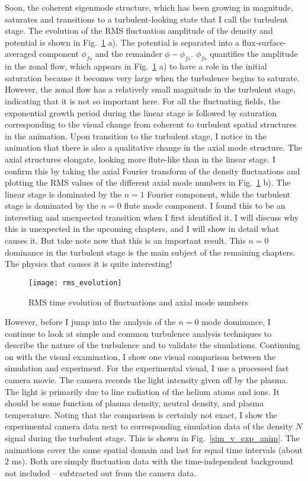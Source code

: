 Soon, the coherent eigenmode structure, which has been growing in magnitude, saturates and transitions to a turbulent-looking state that I call the turbulent stage.
The evolution of the RMS fluctuation amplitude of the density and potential is shown in Fig.~\ref{rms_evolution} a). The potential is separated into a flux-surface-averaged component $\phi_{fs}$
and the remainder $\phi-\phi_{fs}$. $\phi_{fs}$ quantifies the amplitude in the zonal flow, which appears in Fig.~\ref{rms_evolution} a) to have a role in the initial saturation because it becomes
very large when the turbulence begins to saturate. However, the zonal flow has a relatively small magnitude in the turbulent stage, indicating that it is not so important here.
For all the fluctuating fields, the exponential growth period during the linear stage is followed by saturation corresponding to the
visual change from coherent to turbulent spatial structures in the animation. 
Upon transition to the turbulent stage, I notice in the animation that there is also a qualitative change in the axial
mode structure. The axial structures elongate, looking more flute-like than in the linear stage. I confirm this by taking the axial Fourier transform of the density fluctuations and plotting
the RMS values of the different axial mode numbers in Fig.~\ref{rms_evolution} b). The linear stage is dominated by the $n=1$ Fourier component, while the turbulent stage is dominated
by the $n=0$ flute mode component. I found this to be an interesting and unexpected transition when I first identified it. 
I will discuss why this is unexpected in the upcoming chapters, and I will show in detail what causes it. 
But take note now that this is an important result. This $n=0$ dominance in the turbulent stage is the main subject of the remaining chapters. The physics that causes it is quite interesting!


\begin{figure}
\centerline{\texttt{[image: rms\_evolution]}}
\caption{RMS time evolution of fluctuations and axial mode numbers}
\label{rms_evolution}
\end{figure}


However, before I jump into the analysis of the $n=0$ mode dominance, I continue to look at simple and common turbulence analysis techniques to describe the nature of the turbulence
and to validate the simulations.
Continuing on with the visual examination, I show one visual comparison between the simulation and experiment. For the experimental visual, I use a processed
fast camera movie. The camera records the light intensity given off by the plasma. The light is primarily due to line radiation of the helium atoms and ions. It should be some function
of plasma density, neutral density, and plasma temperature. Noting that the comparison is certainly not exact, I show the experimental camera data next to corresponding simulation
data of the density $N$ signal during the turbulent stage. This is shown in Fig.~\ref{sim_v_exp_anim}. 
The animations cover the same spatial domain and last for equal time intervals (about 2 ms). Both are simply fluctuation
data with the time-independent background not included -- subtracted out from the camera data. 

